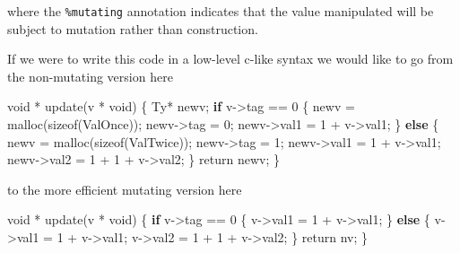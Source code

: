 \documentclass[
]{article}
\newenvironment{Shaded}{}{}
\newcommand{\DataTypeTok}[1]{\textcolor[rgb]{0.56,0.13,0.00}{#1}}
\newcommand{\DecValTok}[1]{\textcolor[rgb]{0.25,0.63,0.44}{#1}}
\newcommand{\FunctionTok}[1]{\textcolor[rgb]{0.02,0.16,0.49}{#1}}
\newcommand{\KeywordTok}[1]{\textcolor[rgb]{0.00,0.44,0.13}{\textbf{#1}}}
\newcommand{\NormalTok}[1]{#1}
\newcommand{\OperatorTok}[1]{\textcolor[rgb]{0.40,0.40,0.40}{#1}}
\newcommand{\OtherTok}[1]{\textcolor[rgb]{0.00,0.44,0.13}{#1}}
\begin{document}
where the \texttt{\%mutating} annotation indicates that the value
manipulated will be subject to mutation rather than construction.

If we were to write this code in a low-level c-like syntax we would like
to go from the non-mutating version here

\begin{Shaded}
\begin{Highlighting}[]
\NormalTok{void }\OperatorTok{*}\NormalTok{ update(v }\OperatorTok{*}\NormalTok{ void) \{}
    \DataTypeTok{Ty}\OperatorTok{*}\NormalTok{ newv;}
    \KeywordTok{if}\NormalTok{ v}\OtherTok{{-}\textgreater{}}\NormalTok{tag }\OperatorTok{==} \DecValTok{0}\NormalTok{ \{}
\NormalTok{        newv }\OtherTok{=}\NormalTok{ malloc(sizeof(}\DataTypeTok{ValOnce}\NormalTok{));}
\NormalTok{        newv}\OtherTok{{-}\textgreater{}}\NormalTok{tag }\OtherTok{=} \DecValTok{0}\NormalTok{;}
\NormalTok{        newv}\OtherTok{{-}\textgreater{}}\NormalTok{val1 }\OtherTok{=} \DecValTok{1} \OperatorTok{+}\NormalTok{ v}\OtherTok{{-}\textgreater{}}\NormalTok{val1;}
\NormalTok{    \} }\KeywordTok{else}\NormalTok{ \{}
\NormalTok{        newv }\OtherTok{=}\NormalTok{ malloc(sizeof(}\DataTypeTok{ValTwice}\NormalTok{));}
\NormalTok{        newv}\OtherTok{{-}\textgreater{}}\NormalTok{tag }\OtherTok{=} \DecValTok{1}\NormalTok{;}
\NormalTok{        newv}\OtherTok{{-}\textgreater{}}\NormalTok{val1 }\OtherTok{=} \DecValTok{1} \OperatorTok{+}\NormalTok{ v}\OtherTok{{-}\textgreater{}}\NormalTok{val1;}
\NormalTok{        newv}\OtherTok{{-}\textgreater{}}\NormalTok{val2 }\OtherTok{=} \DecValTok{1} \OperatorTok{+} \DecValTok{1} \OperatorTok{+}\NormalTok{ v}\OtherTok{{-}\textgreater{}}\NormalTok{val2;}
\NormalTok{    \}}
    \FunctionTok{return}\NormalTok{ newv;}
\NormalTok{\}}
\end{Highlighting}
\end{Shaded}

to the more efficient mutating version here

\begin{Shaded}
\begin{Highlighting}[]
\NormalTok{void }\OperatorTok{*}\NormalTok{ update(v }\OperatorTok{*}\NormalTok{ void) \{}
    \KeywordTok{if}\NormalTok{ v}\OtherTok{{-}\textgreater{}}\NormalTok{tag }\OperatorTok{==} \DecValTok{0}\NormalTok{ \{}
\NormalTok{        v}\OtherTok{{-}\textgreater{}}\NormalTok{val1 }\OtherTok{=} \DecValTok{1} \OperatorTok{+}\NormalTok{ v}\OtherTok{{-}\textgreater{}}\NormalTok{val1;}
\NormalTok{    \} }\KeywordTok{else}\NormalTok{ \{}
\NormalTok{        v}\OtherTok{{-}\textgreater{}}\NormalTok{val1 }\OtherTok{=} \DecValTok{1} \OperatorTok{+}\NormalTok{ v}\OtherTok{{-}\textgreater{}}\NormalTok{val1;}
\NormalTok{        v}\OtherTok{{-}\textgreater{}}\NormalTok{val2 }\OtherTok{=} \DecValTok{1} \OperatorTok{+} \DecValTok{1} \OperatorTok{+}\NormalTok{ v}\OtherTok{{-}\textgreater{}}\NormalTok{val2;}
\NormalTok{    \}}
    \FunctionTok{return}\NormalTok{ nv;}
\NormalTok{\}}
\end{Highlighting}
\end{Shaded}
\end{document}
